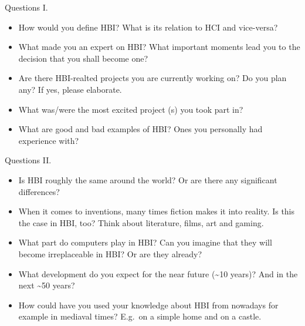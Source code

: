 \documentclass[10pt]{beamer}
\begin{document}
\begin{frame}{Questions I.}
	\begin{itemize}
        \pause{}
		\item How would you define HBI\@? What is its relation to HCI and vice-versa?
		\pause{}
		\item What made you an expert on HBI\@? What important moments lead you to the decision that you shall become one?
		\pause{}
		\item Are there HBI-realted projects you are currently working on? Do you plan any? If yes, please elaborate.
		\pause{}
		\item What was/were the most excited project (s) you took part in?
		\pause{}
		\item What are good and bad examples of HBI\@? Ones you personally had experience with?
	\end{itemize}	
\end{frame}


\begin{frame}{Questions II.}
	\begin{itemize}
        \pause{}
		\item Is HBI roughly the same around the world? Or are there any significant differences?
		\pause{}
		\item When it comes to inventions, many times fiction makes it into reality. Is this the case in HBI, too? Think about literature, films, art and gaming.
		\pause{}
		\item What part do computers play in HBI\@? Can you imagine that they will become irreplaceable in HBI\@? Or are they already?
		\pause{}
		\item What development do you expect for the near future (\~{}10 years)? And in the next \~{}50 years?
		\pause{}
    \item How could have you used your knowledge about HBI from nowadays for example in mediaval times? E.g.\ on a simple home and on a castle.
	\end{itemize}	
\end{frame}

\end{document}
